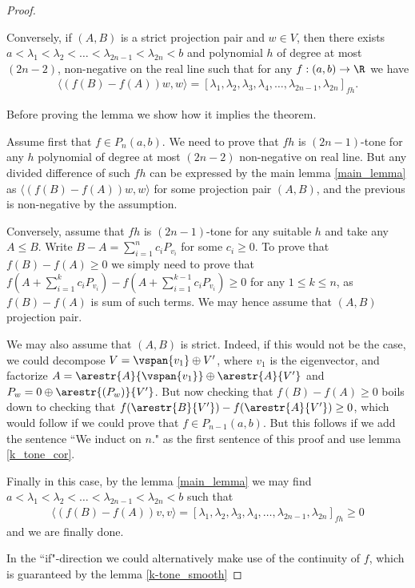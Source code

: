 \begin{proof}
\begin{lem}
		Conversely, if $(A, B)$ is a strict projection pair and $w \in V$, then there exists $a < \lambda_{1} < \lambda_{2} < \ldots < \lambda_{2 n - 1} < \lambda_{2 n} < b$ and polynomial $h$ of degree at most $(2 n - 2)$, non-negative on the real line such that for any $f : (a, b) \to \R$ we have
		\begin{align*}
			\langle (f(B) - f(A)) w, w \rangle = [\lambda_{1}, \lambda_{2}, \lambda_{3}, \lambda_{4}, \ldots, \lambda_{2n - 1}, \lambda_{2 n}]_{f h}.
		\end{align*}
	\end{lem}

	Before proving the lemma we show how it implies the theorem.

	Assume first that $f \in P_{n}(a, b)$. We need to prove that $f h$ is $(2 n - 1)$-tone for any $h$ polynomial of degree at most $(2 n - 2)$ non-negative on real line. But any divided difference of such $f h$ can be expressed by the main lemma \ref{main_lemma} as $\langle (f(B) - f(A)) w, w \rangle$ for some projection pair $(A, B)$, and the previous is non-negative by the assumption.

	Conversely, assume that $f h$ is $(2 n - 1)$-tone for any suitable $h$ and take any $A \leq B$. Write $B - A = \sum_{i = 1}^{n} c_{i} P_{v_{i}}$ for some $c_{i} \geq 0$. To prove that $f(B) - f(A) \geq 0$ we simply need to prove that $f(A + \sum_{i = 1}^{k} c_{i} P_{v_{i}}) - f(A + \sum_{i = 1}^{k - 1} c_{i} P_{v_{i}}) \geq 0$ for any $1 \leq k \leq n$, as $f(B) - f(A)$ is sum of such terms. We may hence assume that $(A, B)$ projection pair.

	We may also assume that $(A, B)$ is strict. Indeed, if this would not be the case, we could decompose $V = \vspan\{v_{1}\} \oplus V'$, where $v_{1}$ is the eigenvector, and factorize $A = \arestr{A}{\vspan\{v_{1}\}} \oplus \arestr{A}{V'}$ and $P_{w} = 0 \oplus \arestr{(P_{w})}{V'}$. But now checking that $f(B) - f(A) \geq 0$ boils down to checking that $f(\arestr{B}{V'}) - f(\arestr{A}{V'}) \geq 0$, which would follow if we could prove that $f \in P_{n - 1}(a, b)$. But this follows if we add the sentence ``We induct on $n$." as the first sentence of this proof and use lemma \ref{k_tone_cor}.

	Finally in this case, by the lemma \ref{main_lemma} we may find $a < \lambda_{1} < \lambda_{2} < \ldots < \lambda_{2 n - 1} < \lambda_{2 n} < b$ such that
	\begin{align*}
		\langle (f(B) - f(A)) v, v \rangle = [\lambda_{1}, \lambda_{2}, \lambda_{3}, \lambda_{4}, \ldots, \lambda_{2n - 1}, \lambda_{2 n}]_{f h} \geq 0
	\end{align*}
	and we are finally done.

	In the ``if"-direction we could alternatively make use of the continuity of $f$, which is guaranteed by the lemma \ref{k-tone_smooth}

\end{proof}

